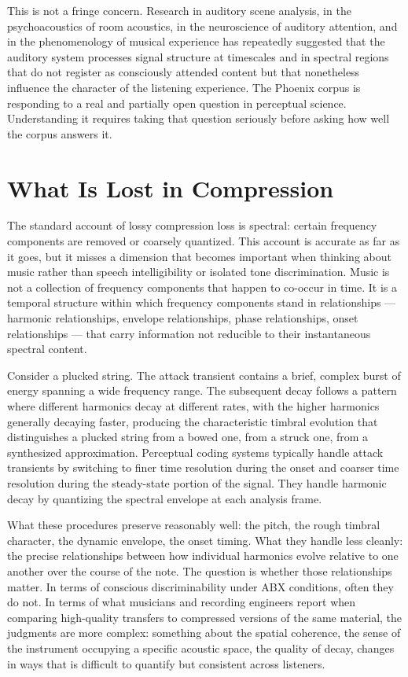 This is not a fringe concern. Research in auditory scene analysis,
in the psychoacoustics of room acoustics, in the neuroscience of
auditory attention, and in the phenomenology of musical experience
has repeatedly suggested that the auditory system processes signal
structure at timescales and in spectral regions that do not register
as consciously attended content but that nonetheless influence the
character of the listening experience. The Phoenix corpus is
responding to a real and partially open question in perceptual
science. Understanding it requires taking that question seriously
before asking how well the corpus answers it.

\section{What Is Lost in Compression}
\label{sec:what-is-lost}

The standard account of lossy compression loss is spectral: certain
frequency components are removed or coarsely quantized. This account
is accurate as far as it goes, but it misses a dimension that becomes
important when thinking about music rather than speech intelligibility
or isolated tone discrimination. Music is not a collection of
frequency components that happen to co-occur in time. It is a
temporal structure within which frequency components stand in
relationships --- harmonic relationships, envelope relationships,
phase relationships, onset relationships --- that carry information
not reducible to their instantaneous spectral content.

Consider a plucked string. The attack transient contains a brief,
complex burst of energy spanning a wide frequency range. The
subsequent decay follows a pattern where different harmonics
decay at different rates, with the higher harmonics generally
decaying faster, producing the characteristic timbral evolution
that distinguishes a plucked string from a bowed one, from a
struck one, from a synthesized approximation. Perceptual coding
systems typically handle attack transients by switching to finer
time resolution during the onset and coarser time resolution during
the steady-state portion of the signal. They handle harmonic decay
by quantizing the spectral envelope at each analysis frame.

What these procedures preserve reasonably well: the pitch, the rough
timbral character, the dynamic envelope, the onset timing. What they
handle less cleanly: the precise relationships between how individual
harmonics evolve relative to one another over the course of the note.
The question is whether those relationships matter. In terms of
conscious discriminability under ABX conditions, often they do not.
In terms of what musicians and recording engineers report when
comparing high-quality transfers to compressed versions of the same
material, the judgments are more complex: something about the spatial
coherence, the sense of the instrument occupying a specific acoustic
space, the quality of decay, changes in ways that is difficult to
quantify but consistent across listeners.

